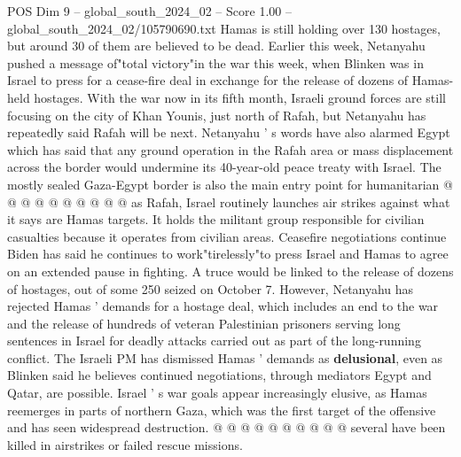 \begin{textsample}{POS Dim 9 – global\_south\_2024\_02 – Score 1.00 – global\_south\_2024\_02/105790690.txt}
Hamas is still holding over 130 hostages, but around 30 of them are believed to be dead.
Earlier this week, Netanyahu pushed a message of"total victory"in the war this week, when Blinken was in Israel to press for a cease-fire deal in exchange for the release of dozens of Hamas-held hostages.
With the war now in its fifth month, Israeli ground forces are still focusing on the city of Khan Younis, just north of Rafah, but Netanyahu has repeatedly said Rafah will be next.
Netanyahu ' s words have also alarmed Egypt which has said that any ground operation in the Rafah area or mass displacement across the border would undermine its 40-year-old peace treaty with Israel.
The mostly sealed Gaza-Egypt border is also the main entry point for humanitarian @ @ @ @ @ @ @ @ @ @ as Rafah, Israel routinely launches air strikes against what it says are Hamas targets.
It holds the militant group responsible for civilian casualties because it operates from civilian areas.
Ceasefire negotiations continue Biden has said he continues to work"tirelessly"to press Israel and Hamas to agree on an extended pause in fighting.
A truce would be linked to the release of dozens of hostages, out of some 250 seized on October 7.
However, Netanyahu has rejected Hamas ' demands for a hostage deal, which includes an end to the war and the release of hundreds of veteran Palestinian prisoners serving long sentences in Israel for deadly attacks carried out as part of the long-running conflict.
The Israeli PM has dismissed Hamas ' demands as \textbf{delusional}, even as Blinken said he believes continued negotiations, through mediators Egypt and Qatar, are possible.
Israel ' s war goals appear increasingly elusive, as Hamas reemerges in parts of northern Gaza, which was the first target of the offensive and has seen widespread destruction. @ @ @ @ @ @ @ @ @ @ several have been killed in airstrikes or failed rescue missions.

\end{textsample}
